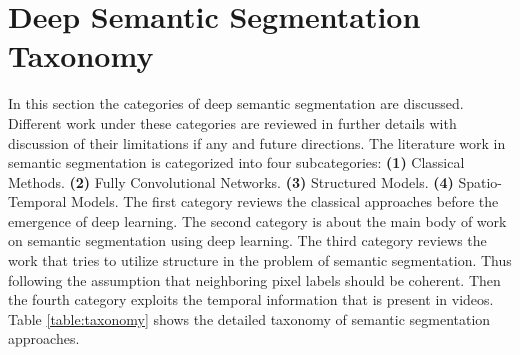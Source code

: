 \documentclass[conference]{IEEEtran}
\begin{document}
\section{Deep Semantic Segmentation Taxonomy} \label{sec:tax}
In this section the categories of deep semantic segmentation are discussed. Different work under these categories are reviewed in further details with discussion of their limitations if any and future directions. The literature work in semantic segmentation is categorized into four subcategories: \textbf{(1)} Classical Methods. \textbf{(2)} Fully Convolutional Networks. \textbf{(3)} Structured Models. \textbf{(4)} Spatio-Temporal Models. The first category reviews the classical approaches before the emergence of deep learning. The second category is about the main body of work on semantic segmentation using deep learning. The third category reviews the work that tries to utilize structure in the problem of semantic segmentation. Thus following the assumption that neighboring pixel labels should be coherent. Then the fourth category exploits the temporal information that is present in videos. Table \ref{table:taxonomy} shows the detailed taxonomy of semantic segmentation approaches.
\end{document}
